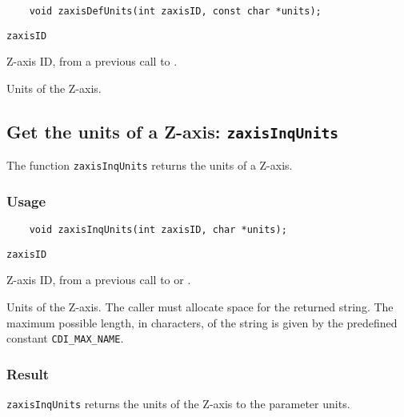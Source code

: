 \begin{verbatim}
    void zaxisDefUnits(int zaxisID, const char *units);
\end{verbatim}

\hspace*{4mm}\begin{minipage}[]{15cm}
\begin{deflist}{\tt zaxisID\ }
\item[{\tt zaxisID}]
Z-axis ID, from a previous call to {}.
\item[{\tt units}]
Units of the Z-axis.

\end{deflist}
\end{minipage}


\subsection{Get the units of a Z-axis: {\tt zaxisInqUnits}}
\label{zaxisInqUnits}

The function {\tt zaxisInqUnits} returns the units of a Z-axis.

\subsubsection*{Usage}

\begin{verbatim}
    void zaxisInqUnits(int zaxisID, char *units);
\end{verbatim}

\hspace*{4mm}\begin{minipage}[]{15cm}
\begin{deflist}{\tt zaxisID\ }
\item[{\tt zaxisID}]
Z-axis ID, from a previous call to {} or {}.
\item[{\tt units}]
Units of the Z-axis. The caller must allocate space for the
                    returned string. The maximum possible length, in characters, of
                    the string is given by the predefined constant {\tt CDI\_MAX\_NAME}.

\end{deflist}
\end{minipage}

\subsubsection*{Result}

{\tt zaxisInqUnits} returns the units of the Z-axis to the parameter units.

